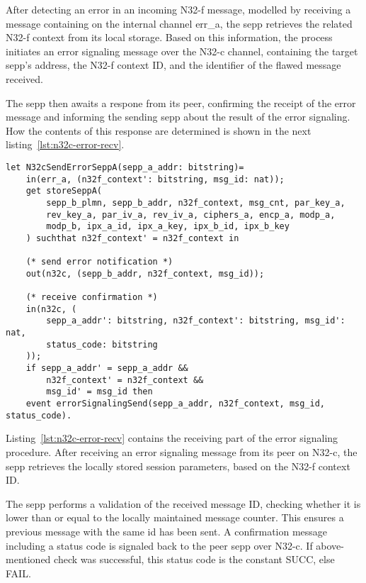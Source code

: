 After detecting an error in an incoming N32-f message, modelled by receiving a message containing on the internal channel {\sffamily err\_a}, the \gls{sepp} retrieves the related N32-f context from its local storage.
Based on this information, the process initiates an error signaling message over the N32-c channel, containing the target \gls{sepp}'s address, the N32-f context ID, and the identifier of the flawed message received.

The \gls{sepp} then awaits a respone from its peer, confirming the receipt of the error message and informing the sending \gls{sepp} about the result of the error signaling.
How the contents of this response are determined is shown in the next listing~\ref{lst:n32c-error-recv}.

\begin{lstlisting}[caption={Definition of the sending error signaling process},label={lst:n32c-error-send},firstnumber=406]
let N32cSendErrorSeppA(sepp_a_addr: bitstring)=
    in(err_a, (n32f_context': bitstring, msg_id: nat));
    get storeSeppA(
        sepp_b_plmn, sepp_b_addr, n32f_context, msg_cnt, par_key_a,
        rev_key_a, par_iv_a, rev_iv_a, ciphers_a, encp_a, modp_a,
        modp_b, ipx_a_id, ipx_a_key, ipx_b_id, ipx_b_key
    ) suchthat n32f_context' = n32f_context in

    (* send error notification *)
    out(n32c, (sepp_b_addr, n32f_context, msg_id));

    (* receive confirmation *)
    in(n32c, (
        sepp_a_addr': bitstring, n32f_context': bitstring, msg_id': nat,
        status_code: bitstring
    ));
    if sepp_a_addr' = sepp_a_addr &&
        n32f_context' = n32f_context &&
        msg_id' = msg_id then
    event errorSignalingSend(sepp_a_addr, n32f_context, msg_id, status_code).
\end{lstlisting}

Listing~\ref{lst:n32c-error-recv} contains the receiving part of the error signaling procedure.
After receiving an error signaling message from its peer on N32-c, the \gls{sepp} retrieves the locally stored session parameters, based on the N32-f context ID.

The \gls{sepp} performs a validation of the received message ID, checking whether it is lower than or equal to the locally maintained message counter.
This ensures a previous message with the same id has been sent.
A confirmation message including a status code is signaled back to the peer \gls{sepp} over N32-c.
If above-mentioned check was successful, this status code is the constant {\sffamily SUCC}, else {\sffamily FAIL}.

